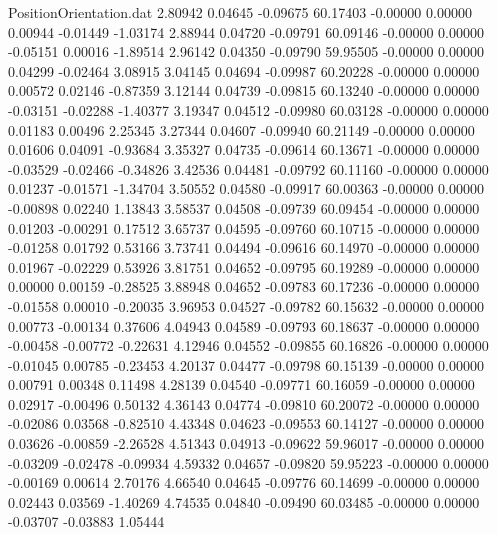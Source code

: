 \begin{filecontents}{PositionOrientation.dat}
   2.80942    0.04645   -0.09675    60.17403   -0.00000    0.00000    0.00944   -0.01449   -1.03174
   2.88944    0.04720   -0.09791    60.09146   -0.00000    0.00000   -0.05151    0.00016   -1.89514
   2.96142    0.04350   -0.09790    59.95505   -0.00000    0.00000    0.04299   -0.02464    3.08915
   3.04145    0.04694   -0.09987    60.20228   -0.00000    0.00000    0.00572    0.02146   -0.87359
   3.12144    0.04739   -0.09815    60.13240   -0.00000    0.00000   -0.03151   -0.02288   -1.40377
   3.19347    0.04512   -0.09980    60.03128   -0.00000    0.00000    0.01183    0.00496    2.25345
   3.27344    0.04607   -0.09940    60.21149   -0.00000    0.00000    0.01606    0.04091   -0.93684
   3.35327    0.04735   -0.09614    60.13671   -0.00000    0.00000   -0.03529   -0.02466   -0.34826
   3.42536    0.04481   -0.09792    60.11160   -0.00000    0.00000    0.01237   -0.01571   -1.34704
   3.50552    0.04580   -0.09917    60.00363   -0.00000    0.00000   -0.00898    0.02240    1.13843
   3.58537    0.04508   -0.09739    60.09454   -0.00000    0.00000    0.01203   -0.00291    0.17512
   3.65737    0.04595   -0.09760    60.10715   -0.00000    0.00000   -0.01258    0.01792    0.53166
   3.73741    0.04494   -0.09616    60.14970   -0.00000    0.00000    0.01967   -0.02229    0.53926
   3.81751    0.04652   -0.09795    60.19289   -0.00000    0.00000    0.00000    0.00159   -0.28525
   3.88948    0.04652   -0.09783    60.17236   -0.00000    0.00000   -0.01558    0.00010   -0.20035
   3.96953    0.04527   -0.09782    60.15632   -0.00000    0.00000    0.00773   -0.00134    0.37606
   4.04943    0.04589   -0.09793    60.18637   -0.00000    0.00000   -0.00458   -0.00772   -0.22631
   4.12946    0.04552   -0.09855    60.16826   -0.00000    0.00000   -0.01045    0.00785   -0.23453
   4.20137    0.04477   -0.09798    60.15139   -0.00000    0.00000    0.00791    0.00348    0.11498
   4.28139    0.04540   -0.09771    60.16059   -0.00000    0.00000    0.02917   -0.00496    0.50132
   4.36143    0.04774   -0.09810    60.20072   -0.00000    0.00000   -0.02086    0.03568   -0.82510
   4.43348    0.04623   -0.09553    60.14127   -0.00000    0.00000    0.03626   -0.00859   -2.26528
   4.51343    0.04913   -0.09622    59.96017   -0.00000    0.00000   -0.03209   -0.02478   -0.09934
   4.59332    0.04657   -0.09820    59.95223   -0.00000    0.00000   -0.00169    0.00614    2.70176
   4.66540    0.04645   -0.09776    60.14699   -0.00000    0.00000    0.02443    0.03569   -1.40269
   4.74535    0.04840   -0.09490    60.03485   -0.00000    0.00000   -0.03707   -0.03883    1.05444

\end{filecontents}
